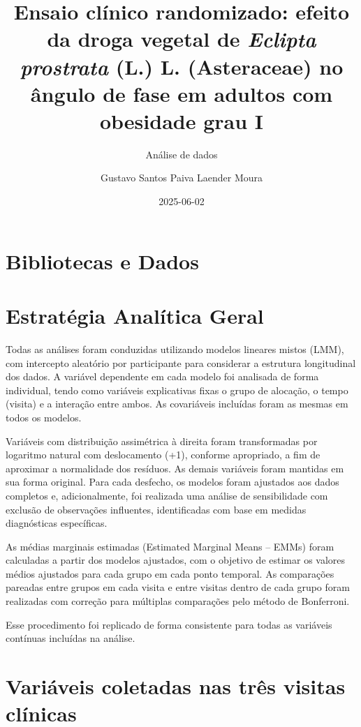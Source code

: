 \documentclass[
  letterpaper,
  DIV=11,
  numbers=noendperiod]{scrartcl}
\title{Ensaio clínico randomizado: efeito da droga vegetal de
\emph{Eclipta prostrata} (L.) L. (Asteraceae) no ângulo de fase em
adultos com obesidade grau I}
\subtitle{Análise de dados}
\author{Gustavo Santos Paiva Laender Moura}
\date{2025-06-02}
\renewcommand*\contentsname{Índice}
\newcommand\contentsname{Índice}
\begin{document}
\maketitle

\renewcommand*\contentsname{Índice}
{
\hypersetup{linkcolor=}
\setcounter{tocdepth}{4}
\tableofcontents
}

\section{Bibliotecas e Dados}\label{bibliotecas-e-dados}

\newpage{}

\section{Estratégia Analítica
Geral}\label{estratuxe9gia-analuxedtica-geral}

Todas as análises foram conduzidas utilizando modelos lineares mistos
(LMM), com intercepto aleatório por participante para considerar a
estrutura longitudinal dos dados. A variável dependente em cada modelo
foi analisada de forma individual, tendo como variáveis explicativas
fixas o grupo de alocação, o tempo (visita) e a interação entre ambos.
As covariáveis incluídas foram as mesmas em todos os modelos.

Variáveis com distribuição assimétrica à direita foram transformadas por
logaritmo natural com deslocamento (+1), conforme apropriado, a fim de
aproximar a normalidade dos resíduos. As demais variáveis foram mantidas
em sua forma original. Para cada desfecho, os modelos foram ajustados
aos dados completos e, adicionalmente, foi realizada uma análise de
sensibilidade com exclusão de observações influentes, identificadas com
base em medidas diagnósticas específicas.

As médias marginais estimadas (Estimated Marginal Means -- EMMs) foram
calculadas a partir dos modelos ajustados, com o objetivo de estimar os
valores médios ajustados para cada grupo em cada ponto temporal. As
comparações pareadas entre grupos em cada visita e entre visitas dentro
de cada grupo foram realizadas com correção para múltiplas comparações
pelo método de Bonferroni.

Esse procedimento foi replicado de forma consistente para todas as
variáveis contínuas incluídas na análise.

\section{Variáveis coletadas nas três visitas
clínicas}\label{variuxe1veis-coletadas-nas-truxeas-visitas-cluxednicas}
\end{document}

